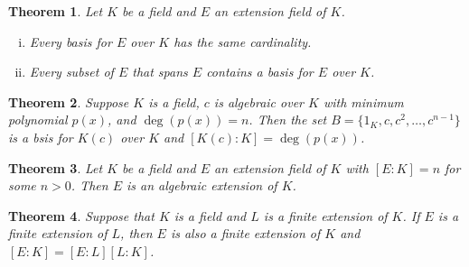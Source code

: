 \documentclass[letterpaper, 12pt]{article}
\newtheorem{defn}{Definition}
\newtheorem{thm}{Theorem}
\begin{document}
			\setcounter{thm}{18}
			\begin{thm}
			Let $K$ be a field and $E$ an extension field of $K$.
				\begin{enumerate}[(i)]
				\item Every basis for $E$ over $K$ has the same cardinality.
				\item Every subset of $E$ that spans $E$ contains a basis for $E$ over $K$.
				\end{enumerate}
			\end{thm}

			\begin{thm}
			Suppose $K$ is a field, $c$ is algebraic over $K$ with minimum polynomial $p(x)$, and $\deg(p(x)) = n$.
			Then the set $B = \{ 1_{K}, c, c^{2}, \dots, c^{n-1} \}$ is a bsis for $K(c)$ over $K$ and $[K(c):K]=\deg(p(x))$.
			\end{thm}

			\begin{thm}
			Let $K$ be a field and $E$ an extension field of $K$ with $[E:K] = n$ for some $n>0$.
			Then $E$ is an algebraic extension of $K$.
			\end{thm}

			\begin{thm}
			Suppose that $K$ is a field and $L$ is a finite extension of $K$.
			If $E$ is a finite extension of $L$, then $E$ is also a finite extension of $K$ and $[E:K] = [E:L][L:K]$.
			\end{thm}

\end{document}
